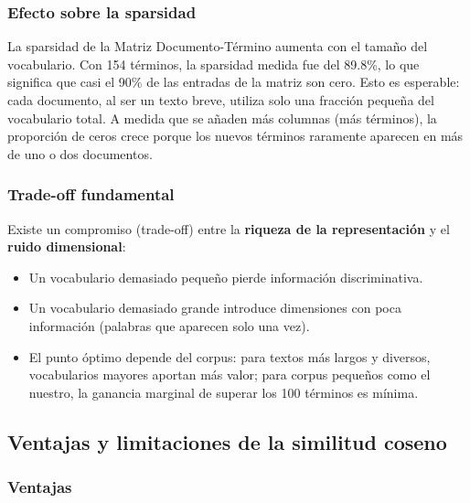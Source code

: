 \subsubsection{Efecto sobre la sparsidad}

La sparsidad de la Matriz Documento-Término aumenta con el tamaño del vocabulario. Con 154 términos, la sparsidad medida fue del 89.8\%, lo que significa que casi el 90\% de las entradas de la matriz son cero. Esto es esperable: cada documento, al ser un texto breve, utiliza solo una fracción pequeña del vocabulario total. A medida que se añaden más columnas (más términos), la proporción de ceros crece porque los nuevos términos raramente aparecen en más de uno o dos documentos.

\subsubsection{Trade-off fundamental}

Existe un compromiso (trade-off) entre la \textbf{riqueza de la representación} y el \textbf{ruido dimensional}:
\begin{itemize}
    \item Un vocabulario demasiado pequeño pierde información discriminativa.
    \item Un vocabulario demasiado grande introduce dimensiones con poca información (palabras que aparecen solo una vez).
    \item El punto óptimo depende del corpus: para textos más largos y diversos, vocabularios mayores aportan más valor; para corpus pequeños como el nuestro, la ganancia marginal de superar los 100 términos es mínima.
\end{itemize}

\subsection{Ventajas y limitaciones de la similitud coseno}

\subsubsection{Ventajas}

